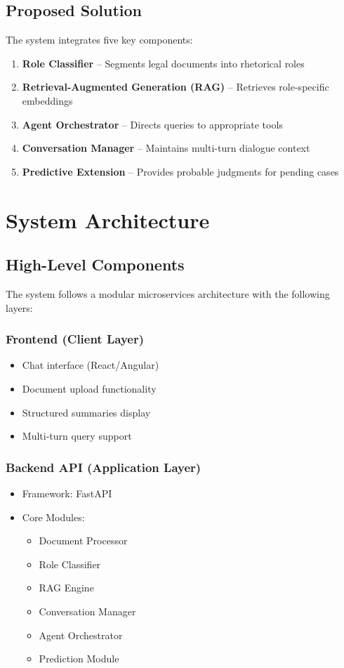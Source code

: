 \documentclass[12pt,a4paper]{article}
\begin{document}
\subsection{Proposed Solution}

The system integrates five key components:

\begin{enumerate}
    \item \textbf{Role Classifier} -- Segments legal documents into rhetorical roles
    \item \textbf{Retrieval-Augmented Generation (RAG)} -- Retrieves role-specific embeddings
    \item \textbf{Agent Orchestrator} -- Directs queries to appropriate tools
    \item \textbf{Conversation Manager} -- Maintains multi-turn dialogue context
    \item \textbf{Predictive Extension} -- Provides probable judgments for pending cases
\end{enumerate}

\section{System Architecture}

\subsection{High-Level Components}

The system follows a modular microservices architecture with the following layers:

\subsubsection{Frontend (Client Layer)}
\begin{itemize}
    \item Chat interface (React/Angular)
    \item Document upload functionality
    \item Structured summaries display
    \item Multi-turn query support
\end{itemize}

\subsubsection{Backend API (Application Layer)}
\begin{itemize}
    \item Framework: FastAPI
    \item Core Modules:
    \begin{itemize}
        \item Document Processor
        \item Role Classifier
        \item RAG Engine
        \item Conversation Manager
        \item Agent Orchestrator
        \item Prediction Module
    \end{itemize}
\end{itemize}
\end{document}
